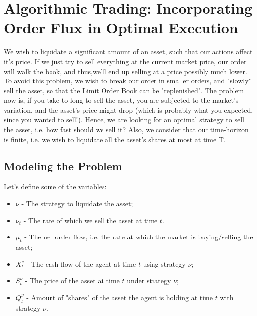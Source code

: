 \newpage

\section{Algorithmic Trading: Incorporating Order Flux in Optimal Execution}

We wish to liquidate a significant amount of an asset, such that
our actions affect it's price.
If we just try to sell everything at the current market price, our order will walk the book, and thus,we'll end up selling at a price possibly much lower. To avoid this problem, we wish to break our order
in smaller orders, and "slowly" sell the asset, so that the Limit Order Book can be "replenished".
The problem now is, if you take to long to sell the asset, you are subjected to the market's variation,
and the asset's price might drop (which is probably what you expected, since you wanted to sell!).
Hence, we are looking for an optimal strategy to sell the asset, i.e. how fast should we sell it?
Also, we consider that our time-horizon is finite, i.e. we wish to liquidate all the asset's shares
at most at time T.

\subsection{Modeling the Problem}
Let's define some of the variables:
\begin{itemize}
  \item $\nu$ - The strategy to liquidate the asset;
  \item $\nu_t$ - The rate of which we sell the asset at time $t$.
  \item $\mu_t$ - The net order flow, i.e. the rate at which the market is buying/selling the asset;
  \item $X_t^\nu$ - The cash flow of the agent at time $t$ using strategy $\nu$;
  \item $S_t^\nu$ - The price of the asset at time $t$ under strategy $\nu$;
  \item $Q_t^\nu$ - Amount of "shares" of the asset the agent is holding at time $t$ with strategy $\nu$.
\end{itemize}

